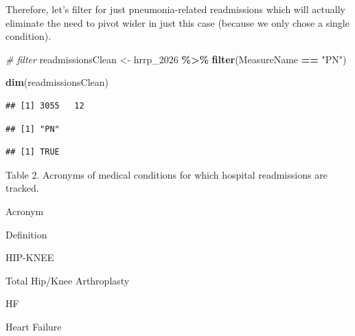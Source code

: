 \documentclass[
]{article}
\newenvironment{Shaded}{\begin{snugshade}}{\end{snugshade}}
\newcommand{\CommentTok}[1]{\textcolor[rgb]{0.56,0.35,0.01}{\textit{#1}}}
\newcommand{\FunctionTok}[1]{\textcolor[rgb]{0.13,0.29,0.53}{\textbf{#1}}}
\newcommand{\NormalTok}[1]{#1}
\newcommand{\OtherTok}[1]{\textcolor[rgb]{0.56,0.35,0.01}{#1}}
\newcommand{\SpecialCharTok}[1]{\textcolor[rgb]{0.81,0.36,0.00}{\textbf{#1}}}
\newcommand{\StringTok}[1]{\textcolor[rgb]{0.31,0.60,0.02}{#1}}
\begin{document}
Therefore, let's filter for just pneumonia-related readmissions which
will actually eliminate the need to pivot wider in just this case
(because we only chose a single condition).

\begin{Shaded}
\begin{Highlighting}[]
\CommentTok{\# filter}
\NormalTok{readmissionsClean }\OtherTok{\textless{}{-}} 
\NormalTok{  hrrp\_2026 }\SpecialCharTok{\%\textgreater{}\%} 
  \FunctionTok{filter}\NormalTok{(MeasureName }\SpecialCharTok{==} \StringTok{"PN"}\NormalTok{)}

\FunctionTok{dim}\NormalTok{(readmissionsClean)}
\end{Highlighting}
\end{Shaded}

\begin{verbatim}
## [1] 3055   12
\end{verbatim}

\begin{Shaded}
\end{Shaded}

\begin{verbatim}
## [1] "PN"
\end{verbatim}

\begin{Shaded}
\end{Shaded}

\begin{verbatim}
## [1] TRUE
\end{verbatim}

Table 2. Acronyms of medical conditions for which hospital readmissions
are tracked.

Acronym

Definition

HIP-KNEE

Total Hip/Knee Arthroplasty

HF

Heart Failure
\end{document}
